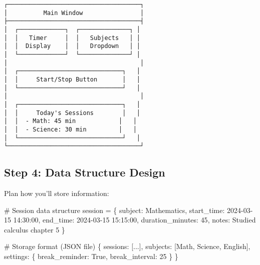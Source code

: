 \documentclass[
  letterpaper,
  DIV=11,
  numbers=noendperiod,
  oneside]{scrreprt}
\newenvironment{Shaded}{}{}
\newcommand{\CommentTok}[1]{\textcolor[rgb]{0.42,0.45,0.49}{#1}}
\newcommand{\DecValTok}[1]{\textcolor[rgb]{0.00,0.36,0.77}{#1}}
\newcommand{\NormalTok}[1]{\textcolor[rgb]{0.14,0.16,0.18}{#1}}
\newcommand{\OperatorTok}[1]{\textcolor[rgb]{0.14,0.16,0.18}{#1}}
\newcommand{\StringTok}[1]{\textcolor[rgb]{0.01,0.18,0.38}{#1}}
\newcommand{\VariableTok}[1]{\textcolor[rgb]{0.89,0.38,0.04}{#1}}
\begin{document}
\begin{verbatim}
┌─────────────────────────────────────┐
│          Main Window                │
├─────────────────────────────────────┤
│  ┌─────────────┐  ┌──────────────┐ │
│  │   Timer     │  │   Subjects   │ │
│  │  Display    │  │   Dropdown   │ │
│  └─────────────┘  └──────────────┘ │
│                                     │
│  ┌─────────────────────────────┐   │
│  │     Start/Stop Button       │   │
│  └─────────────────────────────┘   │
│                                     │
│  ┌─────────────────────────────┐   │
│  │     Today's Sessions        │   │
│  │  - Math: 45 min            │   │
│  │  - Science: 30 min         │   │
│  └─────────────────────────────┘   │
└─────────────────────────────────────┘
\end{verbatim}

\subsection{Step 4: Data Structure
Design}\label{step-4-data-structure-design}

Plan how you'll store information:

\begin{Shaded}
\begin{Highlighting}[]
\CommentTok{\# Session data structure}
\NormalTok{session }\OperatorTok{=}\NormalTok{ \{}
    \StringTok{\textquotesingle{}subject\textquotesingle{}}\NormalTok{: }\StringTok{\textquotesingle{}Mathematics\textquotesingle{}}\NormalTok{,}
    \StringTok{\textquotesingle{}start\_time\textquotesingle{}}\NormalTok{: }\StringTok{\textquotesingle{}2024{-}03{-}15 14:30:00\textquotesingle{}}\NormalTok{,}
    \StringTok{\textquotesingle{}end\_time\textquotesingle{}}\NormalTok{: }\StringTok{\textquotesingle{}2024{-}03{-}15 15:15:00\textquotesingle{}}\NormalTok{,}
    \StringTok{\textquotesingle{}duration\_minutes\textquotesingle{}}\NormalTok{: }\DecValTok{45}\NormalTok{,}
    \StringTok{\textquotesingle{}notes\textquotesingle{}}\NormalTok{: }\StringTok{\textquotesingle{}Studied calculus chapter 5\textquotesingle{}}
\NormalTok{\}}

\CommentTok{\# Storage format (JSON file)}
\NormalTok{\{}
    \StringTok{\textquotesingle{}sessions\textquotesingle{}}\NormalTok{: [...],}
    \StringTok{\textquotesingle{}subjects\textquotesingle{}}\NormalTok{: [}\StringTok{\textquotesingle{}Math\textquotesingle{}}\NormalTok{, }\StringTok{\textquotesingle{}Science\textquotesingle{}}\NormalTok{, }\StringTok{\textquotesingle{}English\textquotesingle{}}\NormalTok{],}
    \StringTok{\textquotesingle{}settings\textquotesingle{}}\NormalTok{: \{}
        \StringTok{\textquotesingle{}break\_reminder\textquotesingle{}}\NormalTok{: }\VariableTok{True}\NormalTok{,}
        \StringTok{\textquotesingle{}break\_interval\textquotesingle{}}\NormalTok{: }\DecValTok{25}
\NormalTok{    \}}
\NormalTok{\}}
\end{Highlighting}
\end{Shaded}
\end{document}
